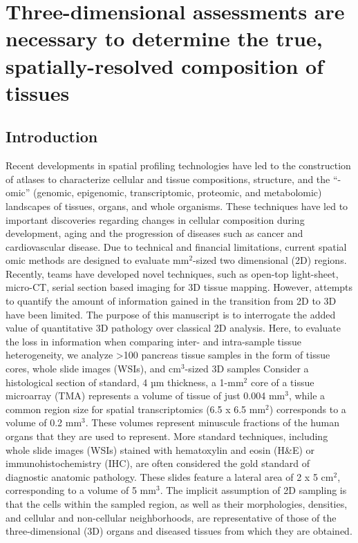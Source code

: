 \chapter{Three-dimensional assessments are necessary to determine the true, spatially-resolved composition of tissues} \label{chap:chap-2}
\begin{refsection}
     
    \section{Introduction}
    Recent developments in spatial profiling technologies have led to the construction of atlases to characterize cellular and tissue compositions, structure, and the “-omic” (genomic, epigenomic, transcriptomic, proteomic, and metabolomic) landscapes of tissues, organs, and whole organisms\cite{Liu2020High,Ozsolak2011RNA,Pidsley2016Critical,Cheng2016Targeting,Braxton20243D,Bell2024PanIN,Vogelstein2013Cancer,Lin2015Highly,Angelo2014Multiplexed}. These techniques have led to important discoveries regarding changes in cellular composition during development, aging and the progression of diseases such as cancer and cardiovascular disease. Due to technical and financial limitations, current spatial omic methods are designed to evaluate mm$^2$-sized two dimensional (2D) regions\cite{Liu2020High,Bell2024PanIN,Goltsev2018Deep,Kuett2021Three,Eng2019Transcriptome,Xia2019Spatial,Bressan2023dawn}. Recently, teams have developed novel techniques, such as open-top light-sheet, micro-CT, serial section based imaging for 3D tissue mapping\cite{Senter2016Role,Liu2023Engineering,Kiemen2022CODA,Gatenbee2023Virtual}. However, attempts to quantify the amount of information gained in the transition from 2D to 3D have been limited. The purpose of this manuscript is to interrogate the added value of quantitative 3D pathology over classical 2D analysis. Here, to evaluate the loss in information when comparing inter- and intra-sample tissue heterogeneity, we analyze >100 pancreas tissue samples in the form of tissue cores, whole slide images (WSIs), and cm$^3$-sized 3D samples
    Consider a histological section of standard, 4 µm thickness, a 1-mm$^2$ core of a tissue microarray (TMA) represents a volume of tissue of just 0.004 mm$^3$, while a common region size for spatial transcriptomics (6.5 x 6.5 mm$^2$) corresponds to a volume of 0.2 mm$^3$. These volumes represent minuscule fractions of the human organs that they are used to represent. More standard techniques, including whole slide images (WSIs) stained with hematoxylin and eosin (H\&E) or immunohistochemistry (IHC), are often considered the gold standard of diagnostic anatomic pathology\cite{Fischer2008Hematoxylin,De2010Immunohistochemistry}. These slides feature a lateral area of 2 x 5 cm$^2$, corresponding to a volume of 5 mm$^3$. The implicit assumption of 2D sampling is that the cells within the sampled region, as well as their morphologies, densities, and cellular and non-cellular neighborhoods, are representative of those of the three-dimensional (3D) organs and diseased tissues from which they are obtained. 

\end{refsection}
